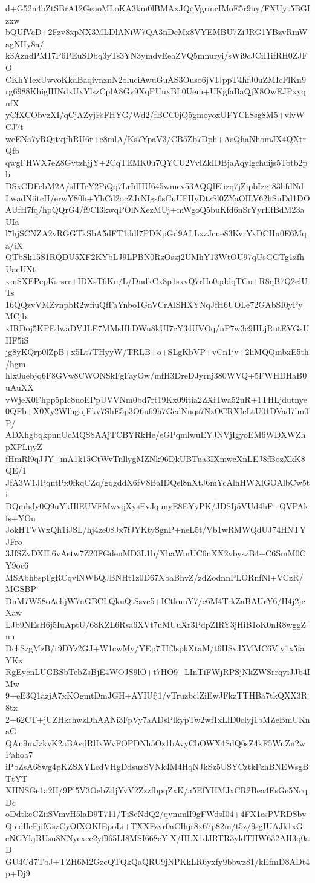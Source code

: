 d+G52n4bZtSBrA12GeaoMLoKA3km0lBMAxJQqVgrmcIMoE5r9uy/FXUyt5BGIzxw
bQUfVcD+2Fzv8xpNX3MLDlANiW7QA3nDeMx8VYEMBU7ZiJRG1YBzvRmWagNHy8a/
k3AzndPM17P6PEuSDbq3yTs3YN3ymdvEeaZVQ5mnuryi/sWi9cJCiI1ifRH0ZJFO
CKhYIexUwvoKkdBaqivnznN2oluciAwuGuAS3Ouso6jVIJppT4hfJ0uZMIcFlKn9
rg6988KhigIHNdxUxYlszCplA8Gv9XqPUuxBL0Uem+UKgfaBaQjX8OwEJPxyqufX
yCfXCObvzXI/qCjAZyjFsFHYG/Wd2/fBCC0jQ5gmoyoxUFYChSsg8M5+vlvWCJ7t
weENa7yRQjtxjfhRU6r+c8mlA/Ks7YpaV3/CB5Zb7Dph+AsQhaNhomJX4QXtrQfb
qwgFHWX7eZ8GvtzhjjY+2CqTEMK0u7QYCU2VvlZkIDBjaAqylgchuijs5Totb2pb
DSxCDFcbM2A/sHTrY2PiQq7LrIdHU645wmev53AQQlElizq7jZipbIzgt83hfdNd
LwadNiitcH/erwY80h+YhCd2ocZJrNIgs6sCuUFHyDtzSl0ZYaOILV62hSnDd1DO
AUfH7fq/hpQQrG4/f9CI3kwqPOlNXezMUj+mWgoQ5buKfd6nSrYyrEfBdM23aUIa
l7hjSCNZA2vRGGTkSbA5dFT1ddl7PDKpGd9ALLxzJcue83KvrYxDCHu0E6Mqa/iX
QTbSk15S1RQDU5XF2KYbLJ9LPBN0RzOszj2UMhY13WtOU97qUsGGTg1zfhUacUXt
xmSXEPepKsrsrr+IDXsT6Ku/L/DndkCx8p1sxvQ7rHo0qddqTCn+R8qB7Q2clUTs
16QQzvVMZvnpbR2wfiuQfFaYnbo1GnVCrAlSHXYNqJfH6UOLe72GAbSI0yPyMCjb
xIRDoj5KPEdwaDVJLE7MMsHhDWu8kUI7cY34UVOq/nP7w3c9HLjRutEVGsUHF5iS
jg8yKQrp0lZpB+x5Lt7THyyW/TRLB+o+SLgKbVP+vCn1jv+2liMQQmbxE5th/hgm
hlx0uebjq6F8GVw8CWONSkFgFayOw/mfH3DreDJyrnj380WVQ+5FWHDHaB0uAuXX
vWjeX0Fhpp5pIc8uoEPpUVVNm0bd7rt19Kx09itia2ZXiTwa52uR+1THLjdutnye
0QFb+X0Xy2WlhgujFkv7ShE5p3O6u69h7GedNnqs7NzOCRXIeLtU01DVad7lm0P/
ADXhgbqkpnnUcMQS8AAjTCBYRkHe/eGPqmlwuEYJNVjIgyoEM6WDXWZhpXPLijyZ
fHmRl9qJJY+mA1k15CtWvTnllygMZNk96DkUBTua3IXmwcXnLEJ8fBozXkK8QE/1
JfA3W1JPqntPx0fkqCZq/gqgddX6fV8BaIDQel8nXtJ6mYcAlhHWXlGOAlbCw5ti
DQmhdy0Q9uYkHlEUVFMwvqXysEvJqunyE8EYyPK/JDSIj5VUd4hF+QVPAkfs+YOu
JokHTVWxQh1iJSL/hj4ze08Jx7fJYKtySgnP+neL5t/Vb1wRMWQdUJ74HNTYJFro
3JfSZvDXIL6vAetw7Z20FGdeuMD3L1b/XbaWmUC6nXX2vbyszB4+C6SmM0CY9oc6
MSAbhbspFgRCqvlNWbQJBNHt1z0D67XbaBhvZ/zdZodnnPLORnfNl+VCzR/MGSBP
DnM7W58oAchjW7nGBCLQkuQtSsvc5+ICtkunY7/c6M4TrkZaBAUrY6/H4j2jcXaw
LJb9NEsH6j5IuAptU/68KZL6Rsa6XVt7uMUuXr3PdpZIRY3jHiB1oK0nR8wggZnu
DchSzgMzB/r9DYz2GJ+W1cwMy/YEp7fHf3spkXtaM/t6HSvJ5MMC6Viy1x5faYKx
RgEycnLUGBSbTebZsBjE4WOJS9lO+t7HO9+LInTiFWjRPSjNkZWSrrqyiJJb4IMw
9+eE3Q1azjA7xKOgmtDmJGH+AYIUfj1/vTruzbclZiEwJFkzTTHBa7tkQXX3R8tx
2+62CT+jUZHkrhwzDhAANi3FpVy7aADsPlkypTw2wf1xLlD0clyj1bMZeBmUKnaG
QAn9mJzkvK2aBAvdRlIxWvFOPDNh5Oz1bAvyCbOWX4SdQ6sZ4kF5WuZn2wPahoa7
iPbZsA68wg4pKZSXYLcdVHgDdsuzSVNk4M4HqNJkSz5USYCztkFzhBNEWsgBTtYT
XHNSGe1a2H/9Pl5V3OebZdjYvV2ZzzfbpqZxK/a5EfYHMJxCR2Bea4EsGe5NcqDc
oDdtkeCZiiSVmvH5laD9T711/TiSeNdQ2/qvmmlI9gFWdsI04+4FX1esPVRDSbyQ
edlIeFjifGszCyOfXOKIEpoLi+TXXFzvr0aCIhjr8x67p82m/t5z/9sgIUAJk1xG
eNGYkjRUsu8NNyexcc2yf965LI8MSI668cYiX/HLX1dJRTR3yldTHW632AH3q0aD
GU4Cd7TbJ+TZH6M2GzcQTQkQaQRU9jNPKkLR6yxfy9bbwz81/kEfmD8ADt4p+Dj9
